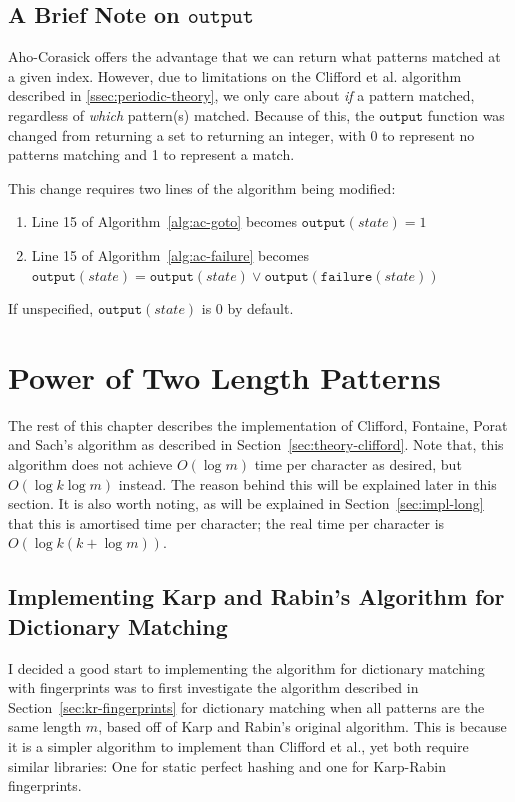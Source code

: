 \documentclass[ %
                    author={Dominic Joseph Moylett},
                    degree={MEng},
                     title={Dictionary Matching with Fingerprints},
                  subtitle={An Empirical Analysis},
                      type={Research},
                      year={2014} ]{dissertation}
\begin{document}
\subsection{A Brief Note on $\texttt{output}$}

Aho-Corasick offers the advantage that we can return what patterns matched at a given index. However, due to limitations on the Clifford et al. algorithm described in \ref{ssec:periodic-theory}, we only care about \textit{if} a pattern matched, regardless of \textit{which} pattern(s) matched. Because of this, the $\texttt{output}$ function was changed from returning a set to returning an integer, with 0 to represent no patterns matching and 1 to represent a match.

This change requires two lines of the algorithm being modified:

\begin{enumerate}
  \item Line 15 of Algorithm~\ref{alg:ac-goto} becomes $\texttt{output}(state) = 1$
  \item Line 15 of Algorithm~\ref{alg:ac-failure} becomes $\texttt{output}(state) = \texttt{output}(state) \vee \texttt{output}(\texttt{failure}(state))$
\end{enumerate}

If unspecified, $\texttt{output}(state)$ is 0 by default.

\section{Power of Two Length Patterns}

The rest of this chapter describes the implementation of Clifford, Fontaine, Porat and Sach's algorithm as described in Section~\ref{sec:theory-clifford}. Note that, this algorithm does not achieve $O(\log m)$ time per character as desired, but $O(\log k\log m)$ instead. The reason behind this will be explained later in this section. It is also worth noting, as will be explained in Section~\ref{sec:impl-long} that this is amortised time per character; the real time per character is $O(\log k(k + \log m))$.

\subsection{Implementing Karp and Rabin's Algorithm for Dictionary Matching}

I decided a good start to implementing the algorithm for dictionary matching with fingerprints was to first investigate the algorithm described in Section~\ref{sec:kr-fingerprints} for dictionary matching when all patterns are the same length $m$, based off of Karp and Rabin's original algorithm. This is because it is a simpler algorithm to implement than Clifford et al., yet both require similar libraries: One for static perfect hashing and one for Karp-Rabin fingerprints.
\end{document}
